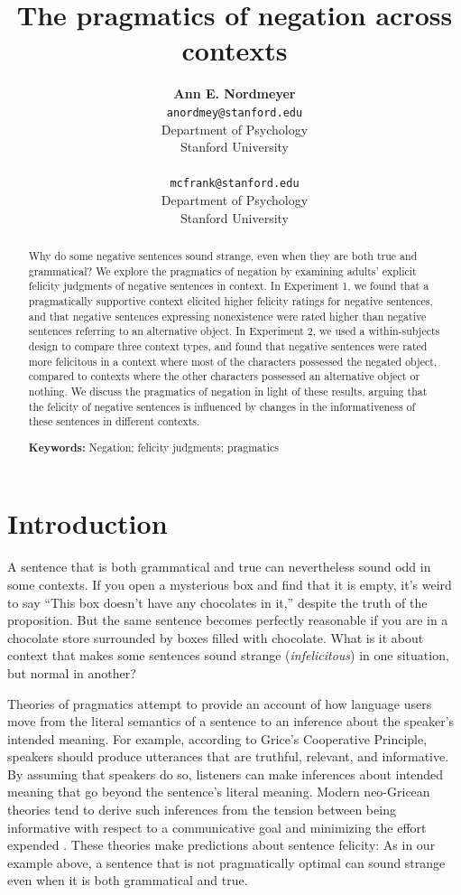 \documentclass[10pt,letterpaper]{article}
\title{The pragmatics of negation across contexts}
\author{{\large \bf Ann E. Nordmeyer} \\ \texttt{anordmey@stanford.edu}\\ Department of Psychology \\ Stanford University \\ 
\And {\large \bf Michael C. Frank} \\ \texttt{mcfrank@stanford.edu} \\ Department of Psychology \\ Stanford University \\ }
\begin{document}
\maketitle


\begin{abstract}
Why do some negative sentences sound strange, even when they are both true and grammatical? We explore the pragmatics of negation by examining adults' explicit felicity judgments of negative sentences in context.  In Experiment 1, we found that a pragmatically supportive context elicited higher felicity ratings for negative sentences, and that negative sentences expressing nonexistence were rated higher than negative sentences referring to an alternative object.  In Experiment 2, we used a within-subjects design to compare three context types, and found that negative sentences were rated more felicitous in a context where most of the characters possessed the negated object, compared to contexts where the other characters possessed an alternative object or nothing.  We discuss the pragmatics of negation in light of these results, arguing that the felicity of negative sentences is influenced by changes in the informativeness of these sentences in different contexts. 

\textbf{Keywords:} 
Negation; felicity judgments; pragmatics
\end{abstract}

\section{Introduction}

A sentence that is both grammatical and true can nevertheless sound odd in some contexts. If you open a mysterious box and find that it is empty, it's weird to say ``This box doesn't have any chocolates in it,'' despite the truth of the proposition. But the same sentence becomes perfectly reasonable if you are in a chocolate store surrounded by boxes filled with chocolate.  What is it about context that makes some sentences sound strange (\emph{infelicitous}) in one situation, but normal in another?

Theories of pragmatics attempt to provide an account of how language users move from the literal semantics of a sentence to an inference about the speaker's intended meaning. For example, according to Grice's \citeyear{grice1975} Cooperative Principle, speakers should produce utterances that are truthful, relevant, and informative.  By assuming that speakers do so, listeners can make inferences about intended meaning that go beyond the sentence's literal meaning. Modern neo-Gricean theories tend to derive such inferences from the tension between being informative with respect to a communicative goal and minimizing the effort expended \cite{horn1984,levinson2000,frank2012}. These theories make predictions about sentence felicity: As in our example above, a sentence that is not pragmatically optimal can sound strange even when it is both grammatical and true.
\end{document}
